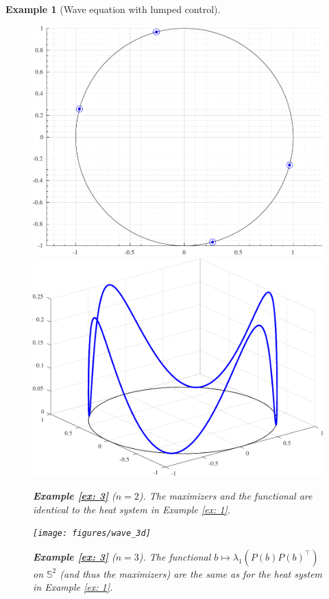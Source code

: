 \documentclass[11pt, a4paper, reqno]{amsart}
\theoremstyle{plain}
\numberwithin{equation}{section}
\newtheorem{example}{Example}[section]
\begin{document}
\begin{example}[Wave equation with lumped control]
	
	\begin{figure}
	\includegraphics[scale=0.42]{figures/wave_opt}
	\hspace{0.1cm}
	\includegraphics[scale=0.42]{figures/wave}
	\caption{\textbf{Example \ref{ex: 3}} ($n=2$).  The maximizers and the functional are identical to the heat system in Example \ref{ex: 1}.}
	\label{fig: ex3.1}
	\end{figure}
	
	\begin{figure}
	\texttt{[image: figures/wave\_3d]}	
	\caption{\textbf{Example \ref{ex: 3}} ($n=3$). The functional $b\mapsto \lambda_1(P(b)P(b)^\top)$ on $\mathbb{S}^2$ (and thus the maximizers) are the same as for the heat system in Example \ref{ex: 1}.}
	  \label{fig: ex3.2}
	\end{figure}
	
	\end{example}
	
\end{document}
